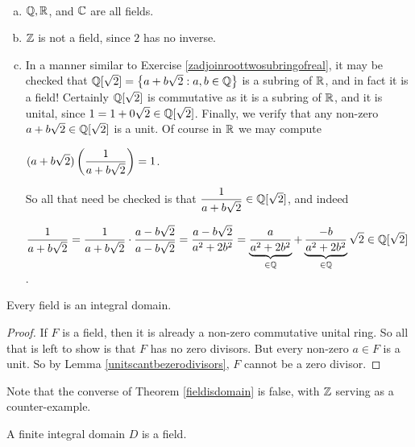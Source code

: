 \documentclass[11pt,fleqn,dvipsnames,usenames]{article}
\begin{document}
\begin{examples}~
\begin{enumerate}[(a)]
\item $\mathbb{Q}, \mathbb{R}$, and $\mathbb{C}$ are all fields.
\item $\mathbb{Z}$ is not a field, since $2$ has no inverse.
\item In a manner similar to Exercise \ref{zadjoinroottwosubringofreal}, it may be checked that $\mathbb{Q}[\sqrt{2}] = \left\{a + b\sqrt{2}:a,b\in\mathbb{Q}\right\}$ is a subring of $\mathbb{R}$, and in fact it is a field!  Certainly $\mathbb{Q}[\sqrt{2}]$ is commutative as it is a subring of $\mathbb{R}$, and it is unital, since $1 = 1 + 0\sqrt{2}\in\mathbb{Q}[\sqrt{2}]$.  Finally, we verify that any non-zero $a+b\sqrt{2}\in \mathbb{Q}[\sqrt{2}]$ is a unit.  Of course in $\mathbb{R}$ we may compute
\begin{center}
$(\displaystyle{a + b\sqrt{2})\left(\frac{1}{a + b\sqrt{2}}\right) = 1}$.
\end{center}
So all that need be checked is that $\dfrac{1}{a + b\sqrt{2}}\in \mathbb{Q}[\sqrt{2}]$, and indeed
\begin{center}
$\displaystyle{\frac{1}{a + b\sqrt{2}} = \frac{1}{a + b\sqrt{2}}\cdot\frac{a - b\sqrt{2}}{a - b\sqrt{2}} = \frac{a - b\sqrt{2}}{a^2 + 2b^2} = \underbrace{\frac{a}{a^2 + 2b^2}}_{\in\mathbb{Q}} + \underbrace{\frac{-b}{a^2 + 2b^2}}_{\in\mathbb{Q}}\sqrt{2}\in\mathbb{Q}[\sqrt{2}]}$.
\end{center}
\end{enumerate}
\end{examples}
%
\begin{theorem}\label{fieldisdomain}
Every field is an integral domain.
\end{theorem}
%
\begin{proof}
If $F$ is a field, then it is already a non-zero commutative unital ring.  So all that is left to show is that $F$ has no zero divisors.  But every non-zero $a\in F$ is a unit.  So by Lemma \ref{unitscantbezerodivisors}, $F$ cannot be a zero divisor.
\end{proof}
%
\begin{remark}
Note that the converse of Theorem \ref{fieldisdomain} is false, with $\mathbb{Z}$ serving as a counter-example.
\end{remark}
%
\begin{theorem}
A finite integral domain $D$ is a field.
\end{theorem}
%
\end{document}

